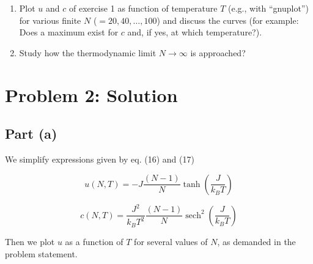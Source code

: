 ﻿\documentclass[11pt]{article}
\begin{document}
\begin{enumerate}
\def\labelenumi{\alph{enumi})}
\item
  Plot \(u\) and \(c\) of exercise 1 as function of temperature \(T\)
  (e.g., with ``gnuplot'') for various finite \(N\)
  (\(= 20, 40, \dots, 100\)) and discuss the curves (for example: Does a
  maximum exist for \(c\) and, if yes, at which temperature?).
\item
  Study how the thermodynamic limit \(N \to \infty\) is approached?
\end{enumerate}

    \section*{Problem 2: Solution}\label{problem-2-solution}

    \subsection*{Part (a)}

We simplify expressions given by eq. (16) and (17)

\[
u(N,T)=-J\frac{(N-1)}{N}\tanh\left(\frac{J}{k_B T}\right) \tag{20}
\]

\[
c(N,T)=\frac{J^2}{k_B T^2}\frac{(N-1)}{N}\operatorname{sech}^2\left(\frac{J}{k_B T}\right) \tag{21}
\]

    Then we plot \(u\) as a function of \(T\) for several values of \(N\),
as demanded in the problem statement.
\end{document}
